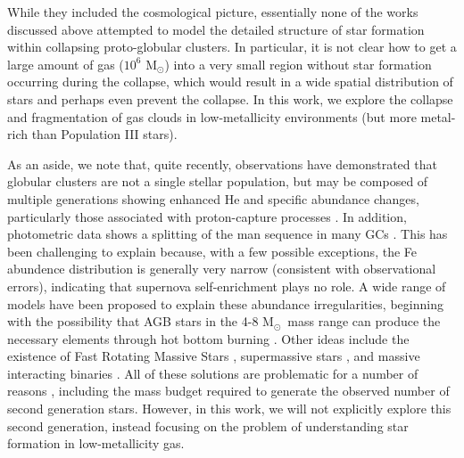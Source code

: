 \documentclass[useAMS,usenatbib]{mn2e}
\newcommand{\msun}{{M$_\odot$}}
\begin{document}
While they included the cosmological picture, essentially none of the works discussed above attempted to model the detailed structure of star formation within collapsing proto-globular clusters.  In particular, it is not clear how to get a large amount of gas ($10^6$ \msun) into a very small region without star formation occurring during the collapse, which would result in a wide spatial distribution of stars and perhaps even prevent the collapse.  In this work, we explore the collapse and fragmentation of gas clouds in low-metallicity environments (but more metal-rich than Population III stars).

As an aside, we note that, quite recently, observations have demonstrated that globular clusters are not a single stellar population, but may be composed of multiple generations showing enhanced He and specific abundance changes, particularly those associated with proton-capture processes \citep[e.g.,][]{Norris1981, Kraft1994, Gratton2001, Carretta2009}.  In addition, photometric data shows a splitting of the man sequence in many GCs \citet[e.g.,][]{Piotto2009, Anderson2009, Milone2010}.  This has been challenging to explain because, with a few possible exceptions, the Fe abundence distribution is generally very narrow (consistent with observational errors), indicating that supernova self-enrichment plays no role.  A wide range of models have been proposed to explain these abundance irregularities, beginning with the possibility that AGB stars in the 4-8 \msun\ mass range can produce the necessary elements through hot bottom burning \citep[e.g.,][]{DErcole2010, Ventura2013}.  Other ideas include the existence of Fast Rotating Massive Stars \citep[FRMS][]{Krause2013}, supermassive stars \citep{Denissenkov2014,  Denissenkov2015}, and massive interacting binaries \citet[e.g.,][]{deMink2009, Bastian2013}.  All of these solutions are problematic for a number of reasons \citep[e.g.,][]{Renzini2015, Bastian2015}, including the mass budget required to generate the observed number of second generation stars.  However, in this work, we will not explicitly explore this second generation, instead focusing on the problem of understanding star formation in low-metallicity gas.
\end{document}
